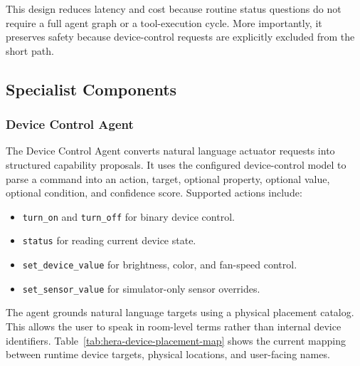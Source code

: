This design reduces latency and cost because routine status questions do not require a full agent graph or a tool-execution cycle. More importantly, it preserves safety because device-control requests are explicitly excluded from the short path.

\subsection{Specialist Components}

\subsubsection{Device Control Agent}

The Device Control Agent converts natural language actuator requests into structured capability proposals. It uses the configured device-control model to parse a command into an action, target, optional property, optional value, optional condition, and confidence score. Supported actions include:

\begin{itemize}[leftmargin=*, itemsep=2pt]
    \item \texttt{turn\_on} and \texttt{turn\_off} for binary device control.
    \item \texttt{status} for reading current device state.
    \item \texttt{set\_device\_value} for brightness, color, and fan-speed control.
    \item \texttt{set\_sensor\_value} for simulator-only sensor overrides.
\end{itemize}

The agent grounds natural language targets using a physical placement catalog. This allows the user to speak in room-level terms rather than internal device identifiers. Table~\ref{tab:hera-device-placement-map} shows the current mapping between runtime device targets, physical locations, and user-facing names.

